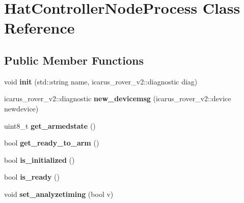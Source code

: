 \hypertarget{classHatControllerNodeProcess}{}\section{Hat\+Controller\+Node\+Process Class Reference}
\label{classHatControllerNodeProcess}
\subsection*{Public Member Functions}
\begin{DoxyCompactItemize}
\item 
\mbox{\label{classHatControllerNodeProcess_a387270c6b3db7fd063aa1ab0a805804b}} 
void {\bfseries init} (std\+::string name, icarus\+\_\+rover\+\_\+v2\+::diagnostic diag)
\item 
\mbox{\label{classHatControllerNodeProcess_ac0820067a8cf3fdfc8afa42a46a9df23}} 
icarus\+\_\+rover\+\_\+v2\+::diagnostic {\bfseries new\+\_\+devicemsg} (icarus\+\_\+rover\+\_\+v2\+::device newdevice)
\item 
\mbox{\label{classHatControllerNodeProcess_a83aa3c000638ee07ae63d6a03feb71f5}} 
uint8\+\_\+t {\bfseries get\+\_\+armedstate} ()
\item 
\mbox{\label{classHatControllerNodeProcess_a50a347d5a360470ad2bb17cdd4344106}} 
bool {\bfseries get\+\_\+ready\+\_\+to\+\_\+arm} ()
\item 
\mbox{\label{classHatControllerNodeProcess_a01c842b69d96a7b1276e9edc459fdd46}} 
bool {\bfseries is\+\_\+initialized} ()
\item 
\mbox{\label{classHatControllerNodeProcess_a9146c4b27248e588e8366f11df06ccb3}} 
bool {\bfseries is\+\_\+ready} ()
\item 
\mbox{\label{classHatControllerNodeProcess_af82e336b5897619ebd0b6c076b3fa852}} 
void {\bfseries set\+\_\+analyzetiming} (bool v)
\item 
\mbox{\label{classHatControllerNodeProcess_a3477e1840cfe3faba61d929bd3285a01}} 

\end{DoxyCompactItemize}
